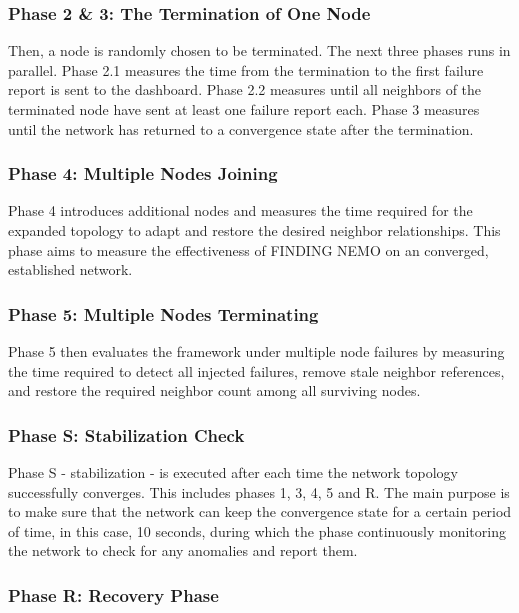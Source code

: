 \subsubsection{Phase 2 \& 3: The Termination of One Node}

Then, a node is randomly chosen to be terminated. The next three phases runs in parallel. Phase 2.1 measures the time
from the termination to the first failure report is sent to the dashboard. Phase 2.2 measures until all neighbors of
the terminated node have sent at least one failure report each. Phase 3 measures until the network has returned to a
convergence state after the termination.

\subsubsection{Phase 4: Multiple Nodes Joining}

Phase 4 introduces additional nodes and measures the time required for the expanded topology to adapt and restore the
desired neighbor relationships. This phase aims to measure the effectiveness of FINDING NEMO on an converged,
established network.

\subsubsection{Phase 5: Multiple Nodes Terminating}

Phase 5 then evaluates the framework under multiple node failures by measuring the time required to detect all injected
failures, remove stale neighbor references, and restore the required neighbor count among all surviving nodes.

\subsubsection{Phase S: Stabilization Check}

Phase S - stabilization - is executed after each time the network topology successfully converges. This includes phases
1, 3, 4, 5 and R. The main purpose is to make sure that the network can keep the convergence state for a certain period
of time, in this case, 10 seconds, during which the phase continuously monitoring the network to check for any
anomalies and report them.

\subsubsection{Phase R: Recovery Phase}


